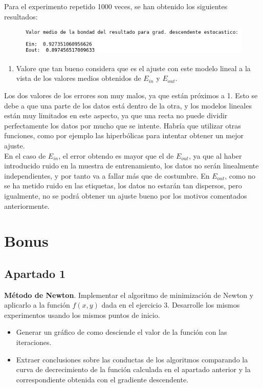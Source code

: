 \documentclass[11pt,a4paper]{article}
\begin{document}
\begin{itemize}
	Para el experimento repetido 1000 veces, se han obtenido los siguientes resultados:
	
	\begin{figure}[H]
	\centering
	\includegraphics[scale=0.6]{img/random_1000_error.png}
	\end{figure}
	
	\begin{enumerate}[resume, label=\alph*)]
		\item Valore que tan bueno considera que es el ajuste con este modelo lineal a la vista de los valores medios
		obtenidos de $E_{in}$ y $E_{out}$.
	\end{enumerate}
	
	Los dos valores de los errores son muy malos, ya que están próximos a 1. Esto se debe a que una parte de los datos está
	dentro de la otra, y los modelos lineales están muy limitados en este aspecto, ya que una recta no puede dividir
	perfectamente los datos por mucho que se intente. Habría que utilizar otras funciones, como por ejemplo las hiperbólicas
	para intentar obtener un mejor ajuste.\\
	
	En el caso de $E_{in}$, el error obtendo es mayor que el de $E_{out}$, ya que al haber introducido ruido en la muestra
	de entrenamiento, los datos no serán linealmente independientes, y por tanto va a fallar más que de costumbre. En
	$E_{out}$, como no se ha metido ruido en las etiquetas, los datos no estarán tan dispersos, pero igualmente, no se
	podrá obtener un ajuste bueno por los motivos comentados anteriormente.
\end{itemize}


\section{Bonus}

\subsection*{Apartado 1}
\noindent \textbf{Método de Newton}. Implementar el algoritmo de minimización de Newton y aplicarlo a la función $f(x, y)$
dada en el ejercicio 3. Desarrolle los mismos experimentos usando los mismos puntos de inicio.

\begin{itemize}
	\item Generar un gráfico de como desciende el valor de la función con las iteraciones.
	\item Extraer conclusiones sobre las conductas de los algoritmos comparando la curva de decrecimiento de la función
	calculada en el apartado anterior y la correspondiente obtenida con el gradiente descendente.
\end{itemize}
\end{document}
